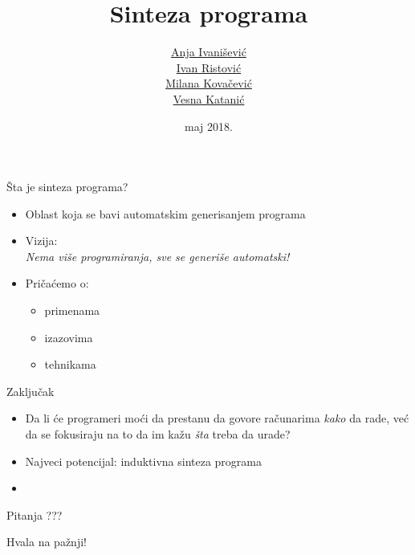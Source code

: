 \documentclass{beamer}
\title{Sinteza programa}
\author{ \href{mailto:anja.ivanisevic95@gmail.com}{Anja Ivanišević}\\ \href{mailto:mi14031@matf.bg.ac.rs}{Ivan Ristović}\\ \href{mailto:mi14042@matf.bg.ac.rs}{Milana Kovačević}\\ \href{mailto:vesna.katanic@gmail.com}{Vesna Katanić}}
\date{maj 2018.}
\begin{document}
\begin{frame}
    \titlepage
\end{frame}

\begin{frame}{\v{S}ta je sinteza programa?}
    \begin{itemize}
        \item Oblast koja se bavi automatskim generisanjem programa
        \item Vizija:\\
            \centering
            \emph{Nema vi\v{s}e programiranja, sve se generi\v{s}e automatski!}
            \\
        \item Pri\v{c}a\'{c}emo o:
        \begin{itemize}
            \item primenama
            \item izazovima
            \item tehnikama
        \end{itemize}
    \end{itemize}
\end{frame}







\begin{frame}{Zaključak}
    \centering
    \begin{itemize}
        \item Da li će programeri moći da prestanu da govore računarima \emph{kako} da rade, već da se fokusiraju na to da im kažu \emph{šta} treba da urade?
        \item Najveci potencijal: induktivna sinteza programa
        \item
    \end{itemize}
\end{frame}


\begin{frame}{Pitanja}
    \centering
    ???
\end{frame}

\begin{frame}{}
    \centering
    Hvala na pažnji!
\end{frame}
\end{document}
